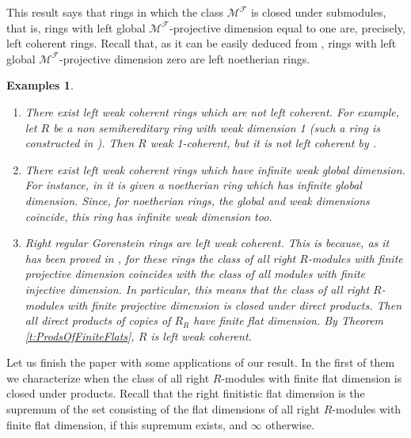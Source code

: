 \documentclass[a4paper,10pt]{amsart}
\newtheorem{examples}[definition]{Examples}
\begin{document}
This result says that rings in which the class $\mathcal M^{\mathcal
  F}$ is closed under submodules, that is, rings with left global
$\mathcal M^{\mathcal F}$-projective dimension equal to one are,
precisely, left coherent rings. Recall that, as it can be easily
deduced from \cite[Theorem 1]{goodearl}, rings with left global
$\mathcal M^{\mathcal F}$-projective dimension zero are left
noetherian rings.

\begin{examples}
  \begin{enumerate}
  \item There exist left weak coherent rings which are not left
    coherent. For example, let $R$ be a non semihereditary ring with
    weak dimension 1 (such a ring is constructed in \cite[Example
    3.1.2]{glaz}). Then $R$ weak 1-coherent, but it is not left
    coherent by \cite[Theorem 3.1.3]{glaz}.

  \item There exist left weak coherent rings which have infinite weak
    global dimension. For instance, in \cite[Example
    7.7.2]{McconnellRobson} it is given a noetherian ring which has
    infinite global dimension. Since, for noetherian rings, the global
    and weak dimensions coincide, this ring has infinite weak
    dimension too.

  \item Right regular Gorenstein rings are left weak coherent. This is
    because, as it has been proved in \cite[Corollary
    VII.2.6]{BeligiannisReiten}, for these rings the class of all
    right $R$-modules with finite projective dimension coincides with
    the class of all modules with finite injective dimension. In
    particular, this means that the class of all right $R$-modules
    with finite projective dimension is closed under direct
    products. Then all direct products of copies of $R_R$ have finite
    flat dimension. By Theorem
    \ref{t:ProdsOfFiniteFlats}, $R$ is left weak coherent.
  \end{enumerate}
\end{examples}

Let us finish the paper with some applications of our result. In the
first of them we characterize when the class of all right $R$-modules with finite
flat dimension is closed under products. Recall that the right finitistic
flat dimension is the supremum of the set consisting of the flat
dimensions of all right $R$-modules with finite flat dimension, if this
supremum exists, and $\infty$ otherwise.
\end{document}
